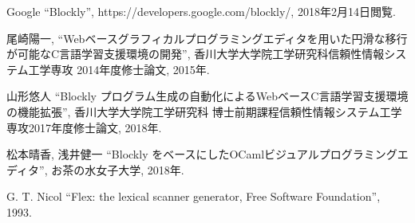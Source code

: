 \documentclass{risepaper}
\begin{document}
\begin{thebibliography}{99} %
                                  
 Google 
 ``Blockly'', https://developers.google.com/blockly/, 2018年2月14日閲覧.

 尾崎陽一,
 ``Webベースグラフィカルプログラミングエディタを用いた円滑な移行が可能なC言語学習支援環境の開発'', 香川大学大学院工学研究科信頼性情報システム工学専攻 2014年度修士論文, 2015年.
 
 山形悠人
 ``Blockly プログラム生成の自動化によるWebベースC言語学習支援環境の機能拡張'', 香川大学大学院工学研究科
博士前期課程信頼性情報システム工学専攻2017年度修士論文, 2018年.

 松本晴香, 浅井健一
 ``Blockly をベースにしたOCamlビジュアルプログラミングエディタ'', お茶の水女子大学, 2018年.
 
 G. T. Nicol
 ``Flex: the lexical scanner generator, Free Software Foundation'', 1993.
 
 

\end{thebibliography}



\insertindex %
\printindex
  
\end{document}
